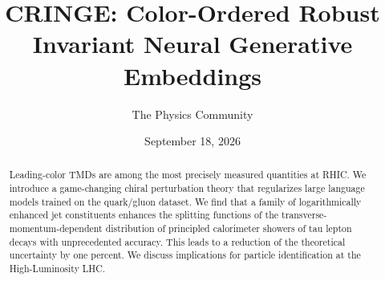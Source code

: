 \documentclass[11pt]{article}
\title{CRINGE: Color-Ordered Robust Invariant Neural Generative Embeddings}
\author{The Physics Community}
\date{September 18, 2026}
\numberwithin{equation}{section}
\theoremstyle{definition}
\theoremstyle{remark}
\begin{document}
\maketitle
\begin{abstract}
Leading-color TMDs are among the most precisely measured quantities at
RHIC. We introduce a game-changing chiral perturbation theory that
regularizes large language models trained on the quark/gluon dataset. We
find that a family of logarithmically enhanced jet constituents enhances
the splitting functions of the transverse-momentum-dependent
distribution of principled calorimeter showers of tau lepton decays with
unprecedented accuracy. This leads to a reduction of the theoretical
uncertainty by one percent. We discuss implications for particle
identification at the High-Luminosity LHC.
\end{abstract}
\tableofcontents



\nocite{*}


\end{document}
